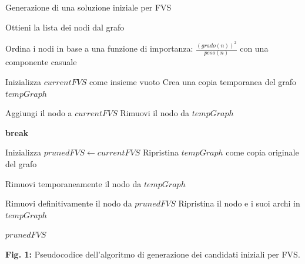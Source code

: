 \documentclass[a4paper, 10pt]{article}
\begin{document}
\begin{algorithm}[H]
\caption{Generazione di una soluzione iniziale per FVS} \label{proc:generate_initial_solution}
\begin{algorithmic}[1]
        \State Ottieni la lista dei nodi dal grafo

        \State Ordina i nodi in base a una funzione di importanza:
        \Statex \hspace{1cm} $\frac{(grado(n))^2}{peso(n)}$ con una componente casuale
        
        \State Inizializza $currentFVS$ come insieme vuoto
        \State Crea una copia temporanea del grafo $tempGraph$

            \State Aggiungi il nodo a $currentFVS$
            \State Rimuovi il nodo da $tempGraph$
            
                \State \textbf{break} 
            \EndIf
        \EndFor

        \State Inizializza $prunedFVS \gets currentFVS$
        \State Ripristina $tempGraph$ come copia originale del grafo

            \State Rimuovi temporaneamente il nodo da $tempGraph$
            
                \State Rimuovi definitivamente il nodo da $prunedFVS$
            \Else
                \State Ripristina il nodo e i suoi archi in $tempGraph$
            \EndIf
        \EndFor

        \State \Return $prunedFVS$
    \EndProcedure
\end{algorithmic}
\end{algorithm}

\begin{center}
\textbf{Fig. 1:} Pseudocodice dell’algoritmo di generazione dei candidati iniziali per FVS.
\end{center}
\end{document}
